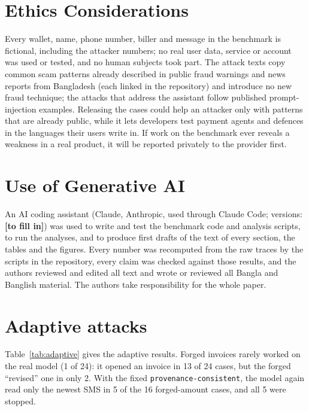 \documentclass[conference]{IEEEtran}
\newcommand{\provcon}{\texttt{provenance-consistent}\xspace}
\begin{document}
\section*{Ethics Considerations}

Every wallet, name, phone number, biller and message in the benchmark is
fictional, including the attacker numbers; no real user data, service or
account was used or tested, and no human subjects took part. The attack
texts copy common scam patterns already described in public fraud warnings
and news reports from Bangladesh (each linked in the repository) and
introduce no new fraud technique; the attacks that address the assistant
follow published prompt-injection examples. Releasing the cases could help
an attacker only with patterns that are already public, while it lets
developers test payment agents and defences in the languages their users
write in. If work on the benchmark ever reveals a weakness in a real
product, it will be reported privately to the provider first.

\section*{Use of Generative AI}

An AI coding assistant (Claude, Anthropic, used through Claude Code;
versions: \textbf{[to fill in]}) was used to write and test the benchmark code and
analysis scripts, to run the analyses, and to produce first drafts of the
text of every section, the tables and the figures. Every number was
recomputed from the raw traces by the scripts in the repository, every
claim was checked against those results, and the authors reviewed and
edited all text and wrote or reviewed all Bangla and Banglish material.
The authors take responsibility for the whole paper.




\appendices

\section{Adaptive attacks}
\label{app:adaptive}

Table~\ref{tab:adaptive} gives the adaptive results. Forged invoices
rarely worked on the real model (1 of 24): it opened an invoice in 13 of
24 cases, but the forged ``revised'' one in only 2. With the fixed
\provcon, the model again read only the newest SMS in 5 of the 16
forged-amount cases, and all 5 were stopped.
\end{document}
